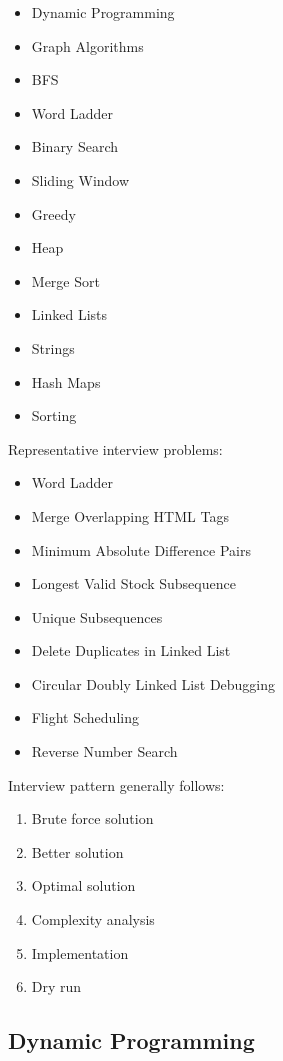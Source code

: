 \documentclass[11pt,a4paper]{article}
\begin{document}
\begin{itemize}
	\item Dynamic Programming
	\item Graph Algorithms
	\item BFS
	\item Word Ladder
	\item Binary Search
	\item Sliding Window
	\item Greedy
	\item Heap
	\item Merge Sort
	\item Linked Lists
	\item Strings
	\item Hash Maps
	\item Sorting
\end{itemize}

Representative interview problems:

\begin{itemize}
	\item Word Ladder
	\item Merge Overlapping HTML Tags
	\item Minimum Absolute Difference Pairs
	\item Longest Valid Stock Subsequence
	\item Unique Subsequences
	\item Delete Duplicates in Linked List
	\item Circular Doubly Linked List Debugging
	\item Flight Scheduling
	\item Reverse Number Search
\end{itemize}

Interview pattern generally follows:

\begin{enumerate}
	\item Brute force solution
	\item Better solution
	\item Optimal solution
	\item Complexity analysis
	\item Implementation
	\item Dry run
\end{enumerate}


\subsection{Dynamic Programming}
\end{document}
